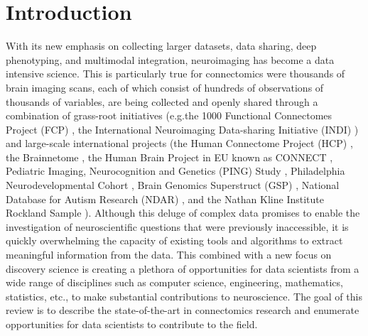 \documentclass{bmcart}
\begin{document}
\begin{frontmatter}
\begin{abstractbox}
\begin{keyword}
\end{keyword}


\end{abstractbox}
%

\end{frontmatter}

\section{Introduction}

With its new emphasis on collecting larger datasets, data sharing, deep phenotyping, and multimodal integration, neuroimaging has become a data intensive science. This is particularly true for connectomics were thousands of brain imaging scans, each of which consist of hundreds of observations of thousands of variables, are being collected and openly shared through a combination of grass-root initiatives (e.g.the 1000 Functional Connectomes Project (FCP) \cite{Biswal2010}, the International Neuroimaging Data-sharing Initiative (INDI) \cite{Mennes2013}) and large-scale international projects (the Human Connectome Project (HCP) \cite{RosenHCP2010,VanEssen2012}, the Brainnetome \cite{Jiang2013}, the Human Brain Project in EU known as CONNECT \cite{Assaf2013}, Pediatric Imaging, Neurocognition and Genetics (PING) Study \cite{JerniganPING}, Philadelphia Neurodevelopmental Cohort \cite{Satterthwaite2014},  Brain Genomics Superstruct (GSP) \cite{BucknerGSP2014}, National Database for Autism Research (NDAR) \cite{NDAR}, and the Nathan Kline Institute Rockland Sample \cite{Nooner2010}). Although this deluge of complex data promises to enable the investigation of neuroscientific questions that were previously inaccessible, it is quickly overwhelming the capacity of existing tools and algorithms to extract meaningful information from the data. This combined with a new focus on discovery science is creating a plethora of opportunities for data scientists from a wide range of disciplines such as computer science, engineering, mathematics, statistics, etc., to make substantial contributions to neuroscience. The goal of this review is to describe the state-of-the-art in connectomics research and enumerate opportunities for data scientists to contribute to the field.
\end{document}
